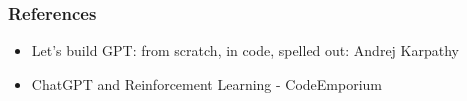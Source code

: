 
			



\begin{frame}[fragile]\frametitle{References}
		\begin{itemize}
		\item Let's build GPT: from scratch, in code, spelled out: Andrej Karpathy
		\item ChatGPT and Reinforcement Learning - CodeEmporium
		\end{itemize}
\end{frame}
